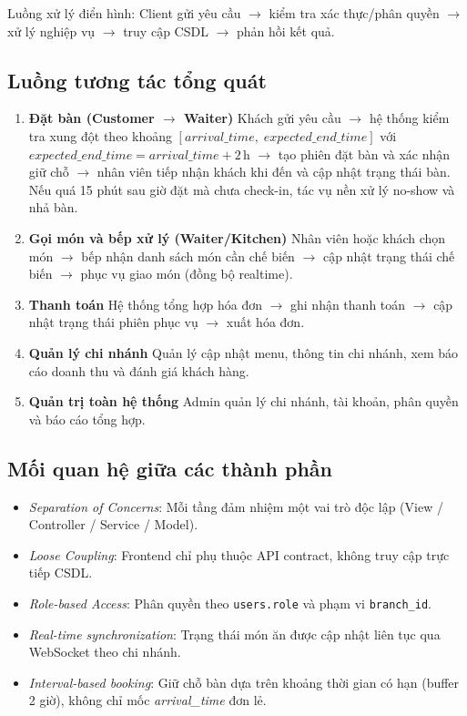 \documentclass[../DoAn.tex]{subfiles}
\begin{document}
Luồng xử lý điển hình: Client gửi yêu cầu $\rightarrow$ kiểm tra xác thực/phân quyền
$\rightarrow$ xử lý nghiệp vụ $\rightarrow$ truy cập CSDL $\rightarrow$ phản hồi kết quả.

\subsection{Luồng tương tác tổng quát}

\begin{enumerate}
    \item \textbf{Đặt bàn (Customer $\rightarrow$ Waiter)}
    Khách gửi yêu cầu $\rightarrow$ hệ thống kiểm tra xung đột theo khoảng
    $[\mathit{arrival\_time},\; \mathit{expected\_end\_time}]$ với $\mathit{expected\_end\_time}=\mathit{arrival\_time}+2\,\mathrm{h}$
    $\rightarrow$ tạo phiên đặt bàn và xác nhận giữ chỗ
    $\rightarrow$ nhân viên tiếp nhận khách khi đến và cập nhật trạng thái bàn.
    Nếu quá 15 phút sau giờ đặt mà chưa check-in, tác vụ nền xử lý no-show và nhả bàn.
    \item \textbf{Gọi món và bếp xử lý (Waiter/Kitchen)}
    Nhân viên hoặc khách chọn món $\rightarrow$ bếp nhận danh sách món cần chế biến
    $\rightarrow$ cập nhật trạng thái chế biến $\rightarrow$ phục vụ giao món (đồng bộ realtime).
    \item \textbf{Thanh toán}
    Hệ thống tổng hợp hóa đơn $\rightarrow$ ghi nhận thanh toán
    $\rightarrow$ cập nhật trạng thái phiên phục vụ $\rightarrow$ xuất hóa đơn.
    \item \textbf{Quản lý chi nhánh}
    Quản lý cập nhật menu, thông tin chi nhánh, xem báo cáo doanh thu và đánh giá khách hàng.
    \item \textbf{Quản trị toàn hệ thống}
    Admin quản lý chi nhánh, tài khoản, phân quyền và báo cáo tổng hợp.
\end{enumerate}

\subsection{Mối quan hệ giữa các thành phần}

\begin{itemize}
    \item \textit{Separation of Concerns}: Mỗi tầng đảm nhiệm một vai trò độc lập (View / Controller / Service / Model).
    \item \textit{Loose Coupling}: Frontend chỉ phụ thuộc API contract, không truy cập trực tiếp CSDL.
    \item \textit{Role-based Access}: Phân quyền theo \texttt{users.role} và phạm vi \texttt{branch\_id}.
    \item \textit{Real-time synchronization}: Trạng thái món ăn được cập nhật liên tục qua WebSocket theo chi nhánh.
    \item \textit{Interval-based booking}: Giữ chỗ bàn dựa trên khoảng thời gian có hạn (buffer 2 giờ), không chỉ mốc \textit{arrival\_time} đơn lẻ.
\end{itemize}
\end{document}
